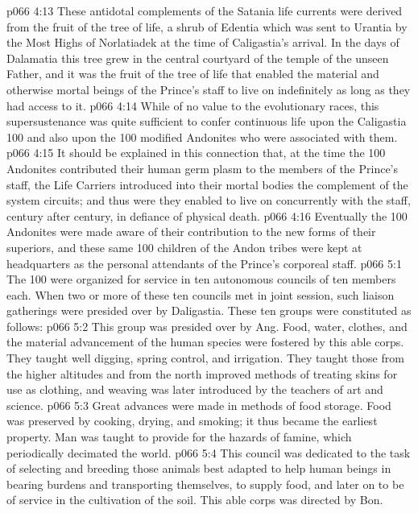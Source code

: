 \vs p066 4:13 These antidotal complements of the Satania life currents were derived from the fruit of the tree of life, a shrub of Edentia which was sent to Urantia by the Most Highs of Norlatiadek at the time of Caligastia’s arrival. In the days of Dalamatia this tree grew in the central courtyard of the temple of the unseen Father, and it was the fruit of the tree of life that enabled the material and otherwise mortal beings of the Prince’s staff to live on indefinitely as long as they had access to it.
\vs p066 4:14 While of no value to the evolutionary races, this supersustenance was quite sufficient to confer continuous life upon the Caligastia 100 and also upon the 100 modified Andonites who were associated with them.
\vs p066 4:15 \pc It should be explained in this connection that, at the time the 100 Andonites contributed their human germ plasm to the members of the Prince’s staff, the Life Carriers introduced into their mortal bodies the complement of the system circuits; and thus were they enabled to live on concurrently with the staff, century after century, in defiance of physical death.
\vs p066 4:16 Eventually the 100 Andonites were made aware of their contribution to the new forms of their superiors, and these same 100 children of the Andon tribes were kept at headquarters as the personal attendants of the Prince’s corporeal staff.
\vs p066 5:1 The 100 were organized for service in ten autonomous councils of ten members each. When two or more of these ten councils met in joint session, such liaison gatherings were presided over by Daligastia. These ten groups were constituted as follows:
\vs p066 5:2 \bibnobreakspace {} This group was presided over by Ang. Food, water, clothes, and the material advancement of the human species were fostered by this able corps. They taught well digging, spring control, and irrigation. They taught those from the higher altitudes and from the north improved methods of treating skins for use as clothing, and weaving was later introduced by the teachers of art and science.
\vs p066 5:3 Great advances were made in methods of food storage. Food was preserved by cooking, drying, and smoking; it thus became the earliest property. Man was taught to provide for the hazards of famine, which periodically decimated the world.
\vs p066 5:4 \bibnobreakspace {} This council was dedicated to the task of selecting and breeding those animals best adapted to help human beings in bearing burdens and transporting themselves, to supply food, and later on to be of service in the cultivation of the soil. This able corps was directed by Bon.
